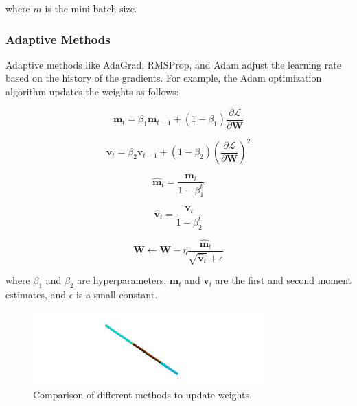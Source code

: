             where \( m \) is the mini-batch size.
    
            \subsubsection{Adaptive Methods}
    
                Adaptive methods like AdaGrad, RMSProp, and Adam adjust the learning rate based on the history of the gradients. For example, the Adam optimization algorithm updates the weights as follows:
                
                \begin{equation}
                \mathbf{m}_t = \beta_1 \mathbf{m}_{t-1} + (1 - \beta_1) \frac{\partial \mathcal{L}}{\partial \mathbf{W}}
                \end{equation}
                
                \begin{equation}
                \mathbf{v}_t = \beta_2 \mathbf{v}_{t-1} + (1 - \beta_2) \left( \frac{\partial \mathcal{L}}{\partial \mathbf{W}} \right)^2
                \end{equation}
                
                \begin{equation}
                \hat{\mathbf{m}}_t = \frac{\mathbf{m}_t}{1 - \beta_1^t}
                \end{equation}
                
                \begin{equation}
                \hat{\mathbf{v}}_t = \frac{\mathbf{v}_t}{1 - \beta_2^t}
                \end{equation}
                
                \begin{equation}
                \mathbf{W} \leftarrow \mathbf{W} - \eta \frac{\hat{\mathbf{m}}_t}{\sqrt{\hat{\mathbf{v}}_t} + \epsilon}
                \end{equation}
                
                where \( \beta_1 \) and \( \beta_2 \) are hyperparameters, \( \mathbf{m}_t \) and \( \mathbf{v}_t \) are the first and second moment estimates, and \( \epsilon \) is a small constant.
                
            \begin{figure}[h]
                \centering
                \includegraphics[width=0.8\textwidth]{00_Images/00_Velocity.png}
                \caption{Comparison of different methods to update weights.}
                \label{fig:update_methods}
            \end{figure}


